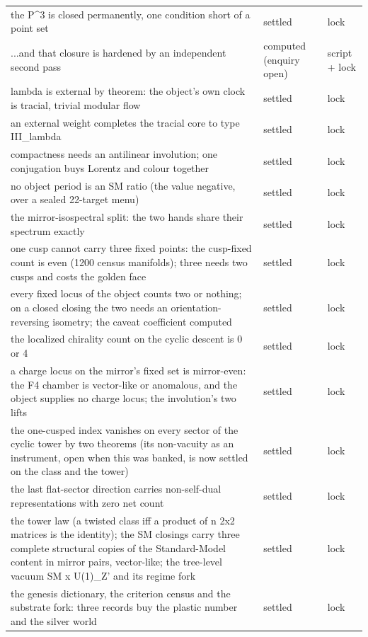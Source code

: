 \documentclass[11pt,a4paper]{article}
\theoremstyle{definition}
\theoremstyle{remark}
\begin{document}
\begin{longtable}{@{}p{9.2cm}p{2.9cm}p{2.0cm}@{}}
the P\^{}3 is closed permanently, one condition short of a point set & settled & lock \\
...and that closure is hardened by an independent second pass & computed (enquiry open) & script + lock \\
lambda is external by theorem: the object's own clock is tracial, trivial modular flow & settled & lock \\
an external weight completes the tracial core to type III\_lambda & settled & lock \\
compactness needs an antilinear involution; one conjugation buys Lorentz and colour together & settled & lock \\
no object period is an SM ratio (the value negative, over a sealed 22-target menu) & settled & lock \\
the mirror-isospectral split: the two hands share their spectrum exactly & settled & lock \\
one cusp cannot carry three fixed points: the cusp-fixed count is even (1200 census manifolds); three needs two cusps and costs the golden face & settled & lock \\
every fixed locus of the object counts two or nothing; on a closed closing the two needs an orientation-reversing isometry; the caveat coefficient computed & settled & lock \\
the localized chirality count on the cyclic descent is 0 or 4 & settled & lock \\
a charge locus on the mirror's fixed set is mirror-even: the F4 chamber is vector-like or anomalous, and the object supplies no charge locus; the involution's two lifts & settled & lock \\
the one-cusped index vanishes on every sector of the cyclic tower by two theorems (its non-vacuity as an instrument, open when this was banked, is now settled on the class and the tower) & settled & lock \\
the last flat-sector direction carries non-self-dual representations with zero net count & settled & lock \\
the tower law (a twisted class iff a product of n 2x2 matrices is the identity); the SM closings carry three complete structural copies of the Standard-Model content in mirror pairs, vector-like; the tree-level vacuum SM x U(1)\_Z' and its regime fork & settled & lock \\
the genesis dictionary, the criterion census and the substrate fork: three records buy the plastic number and the silver world & settled & lock \\

\end{longtable}
\end{document}
